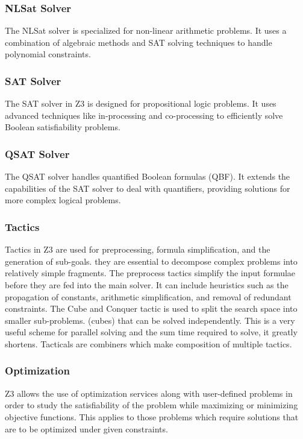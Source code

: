 \documentclass[]{rptuseminar}
\begin{document}
\subsubsection*{NLSat Solver}
The NLSat solver is specialized for non-linear arithmetic problems. 
It uses a combination of algebraic methods and SAT solving techniques to handle polynomial constraints.
\cite{nikolaj_bjorner_programming_nodate}

\subsubsection*{SAT Solver}
The SAT solver in Z3 is designed for propositional logic problems. It uses advanced techniques like in-processing 
and co-processing to efficiently solve Boolean satisfiability problems.
\cite{nikolaj_bjorner_programming_nodate}

\subsubsection*{QSAT Solver}
The QSAT solver handles quantified Boolean formulas (QBF). It extends the capabilities of the SAT solver to deal with quantifiers, 
providing solutions for more complex logical problems.
\cite{nikolaj_bjorner_programming_nodate}


\subsubsection{Tactics}
Tactics in Z3 are used for preprocessing, formula simplification, and the generation of sub-goals. they
are essential to decompose complex problems into relatively simple fragments. The preprocess tactics simplify the input formulae before they are fed into the main solver. It can include heuristics such as the propagation of constants, arithmetic simplification, and removal of redundant constraints. The Cube and Conquer tactic is used to split the search space into smaller sub-problems. (cubes) that can be solved independently. This is a very useful scheme for parallel solving
and the sum time required to solve, it greatly shortens. Tacticals are combiners which make composition of multiple tactics.
\cite{nikolaj_bjorner_programming_nodate}
\subsubsection{Optimization}
Z3 allows the use of optimization services along with user-defined problems in order to study the satisfiability of the problem while maximizing or minimizing objective functions. This applies to those problems which require solutions that are to be optimized under given constraints.
\cite{nikolaj_bjorner_programming_nodate}
\end{document}
